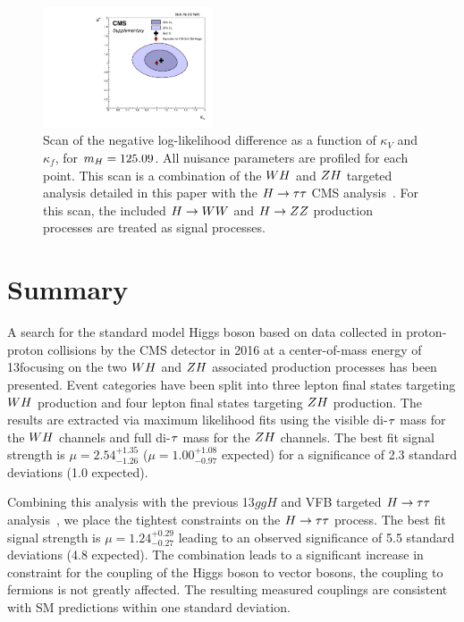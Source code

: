 \begin{figure}[!ht]
 \begin{center}
  \includegraphics[width=0.45\textwidth]{higgs_to_taus_vh/plots/combined/kFkV_HIG-18-007_plus_HIG-16-043.pdf}
 \end{center}
 \caption{Scan of the negative 
 log-likelihood difference as a function of $\kappa_V$ and $\kappa_f$, for 
 $m_{H} = 125.09$\GeV.  All nuisance parameters are profiled for each point. 
 This scan is a combination of the $WH$ and $ZH$ targeted analysis detailed in this paper
 with the $H\to\tau\tau$ CMS analysis~\cite{HIG-16-043}.
 For this scan, the included $H\to WW$ and $H\to ZZ$ production processes 
 are treated as signal processes.
 }
 \label{fig:kVkf}
\end{figure}



\section{Summary}
A search for the standard model Higgs boson based on data collected in proton-proton collisions by the
CMS detector in 2016 at a center-of-mass energy of 13\TeV focusing on the
two $WH$ and $ZH$ associated production processes has been presented. Event
categories have been split into three lepton final states targeting $WH$ production
and four lepton final states targeting $ZH$ production. The results are extracted
via maximum likelihood fits using the visible di-$\tau$ mass for the $WH$
channels and full di-$\tau$ mass for the $ZH$ channels. 
The best fit signal
strength is $\mu = 2.54 ^{+1.35} _{-1.26}$ ($\mu = 1.00 ^{+1.08} _{-0.97}$ expected) 
for a significance of 2.3 standard deviations (1.0 expected).

Combining this analysis with the previous 13\TeV $ggH$ and VFB targeted $H\to\tau\tau$ 
analysis~\cite{HIG-16-043}, we place the tightest constraints
on the $H\to\tau\tau$ process. 
The best fit signal strength is $\mu = 1.24 ^{+0.29} _{-0.27}$ leading to an
observed significance of 5.5 standard deviations (4.8 expected). 
The combination leads to a significant increase in constraint for the coupling
of the Higgs boson to vector bosons, the coupling to fermions is not greatly
affected. The resulting measured couplings are consistent with SM predictions
within one standard deviation.

\clearpage


